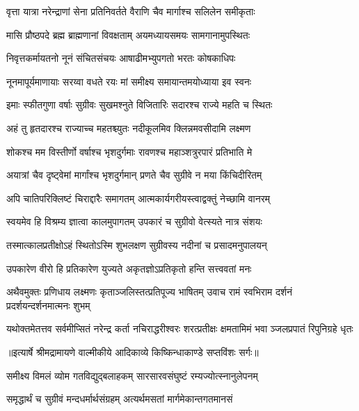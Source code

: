 \twolineshloka
{वृत्ता यात्रा नरेन्द्राणां सेना प्रतिनिवर्तते}
{वैराणि चैव मार्गाश्च सलिलेन समीकृताः} %

\twolineshloka
{मासि प्रौष्ठपदे ब्रह्म ब्राह्मणानां विवक्षताम्}
{अयमध्यायसमयः सामगानामुपस्थितः} %

\twolineshloka
{निवृत्तकर्मायतनो नूनं संचितसंचयः}
{आषाढीमभ्युपगतो भरतः कोषकाधिपः} %

\twolineshloka
{नूनमापूर्यमाणायाः सरय्वा वधते रयः}
{मां समीक्ष्य समायान्तमयोध्याया इव स्वनः} %

\twolineshloka
{इमाः स्फीतगुणा वर्षाः सुग्रीवः सुखमश्नुते}
{विजितारिः सदारश्च राज्ये महति च स्थितः} %

\twolineshloka
{अहं तु हृतदारश्च राज्याच्च महतश्च्युतः}
{नदीकूलमिव क्लिन्नमवसीदामि लक्ष्मण} %

\twolineshloka
{शोकश्च मम विस्तीर्णो वर्षाश्च भृशदुर्गमाः}
{रावणश्च महाञ्शत्रुरपारं प्रतिभाति मे} %

\twolineshloka
{अयात्रां चैव दृष्ट्वेमां मार्गांश्च भृशदुर्गमान्}
{प्रणते चैव सुग्रीवे न मया किंचिदीरितम्} %

\twolineshloka
{अपि चातिपरिक्लिष्टं चिराद्दारैः समागतम्}
{आत्मकार्यगरीयस्त्वाद्वक्तुं नेच्छामि वानरम्} %

\twolineshloka
{स्वयमेव हि विश्रम्य ज्ञात्वा कालमुपागतम्}
{उपकारं च सुग्रीवो वेत्स्यते नात्र संशयः} %

\twolineshloka
{तस्मात्कालप्रतीक्षोऽहं स्थितोऽस्मि शुभलक्षण}
{सुग्रीवस्य नदीनां च प्रसादमनुपालयन्} %

\twolineshloka
{उपकारेण वीरो हि प्रतिकारेण युज्यते}
{अकृतज्ञोऽप्रतिकृतो हन्ति सत्त्ववतां मनः} %

\fourlineindentedshloka
{अथैवमुक्तः प्रणिधाय लक्ष्मणः}
{ कृताञ्जलिस्तत्प्रतिपूज्य भाषितम्}
{उवाच रामं स्वभिराम दर्शनं}
{ प्रदर्शयन्दर्शनमात्मनः शुभम्} %

\fourlineindentedshloka
{यथोक्तमेतत्तव सर्वमीप्सितं}
{ नरेन्द्र कर्ता नचिराद्धरीश्वरः}
{शरत्प्रतीक्षः क्षमतामिमं भवा}
{ञ्जलप्रपातं रिपुनिग्रहे धृतः} %


{॥इत्यार्षे श्रीमद्रामायणे वाल्मीकीये आदिकाव्ये किष्किन्धाकाण्डे सप्तविंशः सर्गः॥}


\twolineshloka
{समीक्ष्य विमलं व्योम गतविद्युद्बलाहकम्}
{सारसारवसंघुष्टं रम्यज्योत्स्नानुलेपनम्} %

\twolineshloka
{समृद्धार्थं च सुग्रीवं मन्दधर्मार्थसंग्रहम्}
{अत्यर्थमसतां मार्गमेकान्तगतमानसं} %

